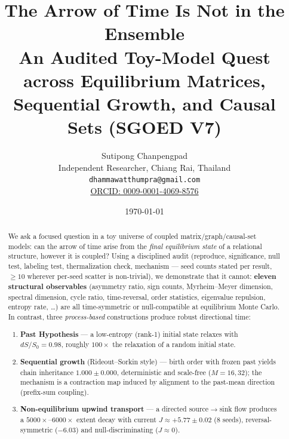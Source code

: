 \documentclass[12pt,a4paper]{article}
\title{\textbf{The Arrow of Time Is Not in the Ensemble}\\[0.4cm]
       \large An Audited Toy-Model Quest across Equilibrium Matrices,
       Sequential Growth, and Causal Sets (SGOED V7)}
\author{Sutipong Chanpengpad\\
\small Independent Researcher, Chiang Rai, Thailand\\
\small \texttt{dhammawatthumpra@gmail.com}\\
\small \href{https://orcid.org/0009-0001-4069-8576}{ORCID: 0009-0001-4069-8576}}
\date{\today}
\providecommand{\tightlist}{%
  \setlength{\itemsep}{0pt}\setlength{\parskip}{0pt}}
\begin{document}
\maketitle

\begin{abstract}
We ask a focused question in a toy universe of coupled
matrix/graph/causal-set models: can the arrow of time arise from the
\emph{final equilibrium state} of a relational structure, however it is
coupled? Using a disciplined audit (reproduce, significance, null test,
labeling test, thermalization check, mechanism --- seed counts stated
per result, \(\ge 10\) wherever per-seed scatter is non-trivial), we
demonstrate that it cannot: \textbf{eleven structural observables}
(asymmetry ratio, sign counts, Myrheim--Meyer dimension, spectral
dimension, cycle ratio, time-reversal, order statistics, eigenvalue
repulsion, entropy rate, \ldots) are all time-symmetric or
null-compatible at equilibrium Monte Carlo. In contrast, three
\emph{process-based} constructions produce robust directional time:

\begin{enumerate}
\def\labelenumi{\arabic{enumi}.}
\tightlist
\item
  \textbf{Past Hypothesis} --- a low-entropy (rank-1) initial state
  relaxes with \(dS/S_0 = 0.98\), roughly \(100\times\) the relaxation
  of a random initial state.
\item
  \textbf{Sequential growth} (Rideout--Sorkin style) --- birth order
  with frozen past yields chain inheritance \(1.000\pm0.000\),
  deterministic and scale-free (\(M=16,32\)); the mechanism is a
  contraction map induced by alignment to the past-mean direction
  (prefix-sum coupling).
\item
  \textbf{Non-equilibrium upwind transport} --- a directed source$\rightarrow$sink
  flow produces a \(5000\times\)--\(6000\times\) extent decay with
  current \(J\approx +5.77\pm0.02\) (8 seeds), reversal-symmetric
  (\(-6.03\)) and null-discriminating (\(J\approx 0\)).
\end{enumerate}


\end{abstract}
\end{document}
